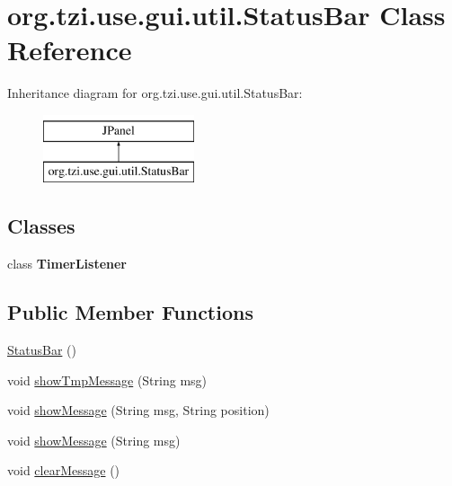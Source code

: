 \hypertarget{classorg_1_1tzi_1_1use_1_1gui_1_1util_1_1_status_bar}{\section{org.\-tzi.\-use.\-gui.\-util.\-Status\-Bar Class Reference}
\label{classorg_1_1tzi_1_1use_1_1gui_1_1util_1_1_status_bar}
}
Inheritance diagram for org.\-tzi.\-use.\-gui.\-util.\-Status\-Bar\-:\begin{figure}[H]
\begin{center}
\leavevmode
\includegraphics[height=2.000000cm]{classorg_1_1tzi_1_1use_1_1gui_1_1util_1_1_status_bar}
\end{center}
\end{figure}
\subsection*{Classes}
\begin{DoxyCompactItemize}
\item 
class {\bfseries Timer\-Listener}
\end{DoxyCompactItemize}
\subsection*{Public Member Functions}
\begin{DoxyCompactItemize}
\item 
\hyperlink{classorg_1_1tzi_1_1use_1_1gui_1_1util_1_1_status_bar_a5f32a62c213d60d3d842dafdd4112635}{Status\-Bar} ()
\item 
void \hyperlink{classorg_1_1tzi_1_1use_1_1gui_1_1util_1_1_status_bar_a44f48073c2050f8b21c9d3f23b4d9ac3}{show\-Tmp\-Message} (String msg)
\item 
void \hyperlink{classorg_1_1tzi_1_1use_1_1gui_1_1util_1_1_status_bar_a79a16c57af5509565c8deb93bc4c76b7}{show\-Message} (String msg, String position)
\item 
void \hyperlink{classorg_1_1tzi_1_1use_1_1gui_1_1util_1_1_status_bar_a1f8f3b0c776f30a058684ed957fcd377}{show\-Message} (String msg)
\item 
void \hyperlink{classorg_1_1tzi_1_1use_1_1gui_1_1util_1_1_status_bar_aca50dd50eb34387839773b4e98ceeee8}{clear\-Message} ()
\end{DoxyCompactItemize}


